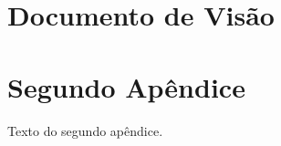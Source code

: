 \begin{apendicesenv}

\partapendices

\chapter{Documento de Visão}


\chapter{Segundo Apêndice}

Texto do segundo apêndice.

\end{apendicesenv}
